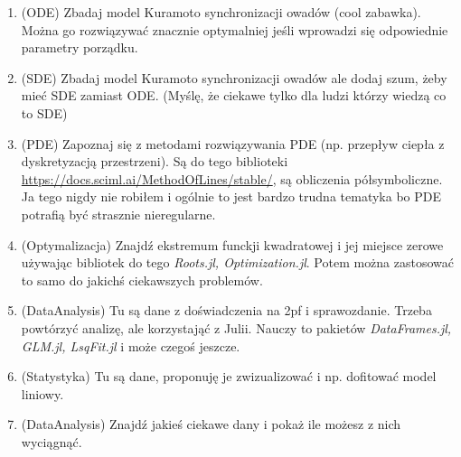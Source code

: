 \documentclass[12pt]{article}
\begin{document}
\begin{enumerate}
\item (ODE)
Zbadaj model Kuramoto synchronizacji owadów (cool zabawka). Można go rozwiązywać znacznie optymalniej jeśli wprowadzi się odpowiednie parametry porządku.
\item (SDE)
Zbadaj model Kuramoto synchronizacji owadów ale dodaj szum, żeby mieć SDE zamiast ODE. (Myślę, że ciekawe tylko dla ludzi którzy wiedzą co to SDE)
\item (PDE)
Zapoznaj się z metodami rozwiązywania PDE (np. przepływ ciepła z dyskretyzacją przestrzeni).
Są do tego biblioteki \url{https://docs.sciml.ai/MethodOfLines/stable/}, są obliczenia półsymboliczne.
Ja tego nigdy nie robiłem i ogólnie to jest bardzo trudna tematyka bo PDE potrafią być strasznie nieregularne.
%
%
\item (Optymalizacja)
Znajdź ekstremum funckji kwadratowej i jej miejsce zerowe używając bibliotek do tego \emph{Roots.jl, Optimization.jl}.
Potem można zastosować to samo do jakichś ciekawszych problemów.
%
\item (DataAnalysis)
Tu są dane z doświadczenia na 2pf i sprawozdanie. Trzeba powtórzyć analizę, ale korzystająć z Julii.
Nauczy to pakietów \emph{DataFrames.jl, GLM.jl, LsqFit.jl} i może czegoś jeszcze.
\item (Statystyka)
Tu są dane, proponuję je zwizualizować i np. dofitować model liniowy.
\item (DataAnalysis)
Znajdź jakieś ciekawe dany i pokaż ile możesz z nich wyciągnąć.




\end{enumerate}
\end{document}
